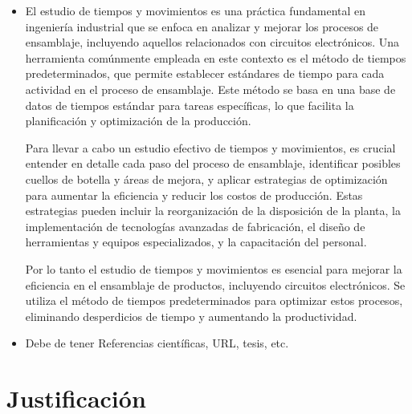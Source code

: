      \begin{itemize}
         \item 
    El estudio de tiempos y movimientos es una práctica fundamental en ingeniería industrial que se enfoca en analizar y mejorar los procesos de ensamblaje, incluyendo aquellos relacionados con circuitos electrónicos. Una herramienta comúnmente empleada en este contexto es el método de tiempos predeterminados, que permite establecer estándares de tiempo para cada actividad en el proceso de ensamblaje. Este método se basa en una base de datos de tiempos estándar para tareas específicas, lo que facilita la planificación y optimización de la producción.
    
    Para llevar a cabo un estudio efectivo de tiempos y movimientos, es crucial entender en detalle cada paso del proceso de ensamblaje, identificar posibles cuellos de botella y áreas de mejora, y aplicar estrategias de optimización para aumentar la eficiencia y reducir los costos de producción. Estas estrategias pueden incluir la reorganización de la disposición de la planta, la implementación de tecnologías avanzadas de fabricación, el diseño de herramientas y equipos especializados, y la capacitación del personal.
    
    Por lo tanto el estudio de tiempos y movimientos es esencial para mejorar la eficiencia en el ensamblaje de productos, incluyendo circuitos electrónicos. Se utiliza el método de tiempos predeterminados para optimizar estos procesos, eliminando desperdicios de tiempo y aumentando la productividad. 
    
    
        \item Debe de tener Referencias científicas, URL, tesis, etc.
        \cite{Niebel}
        
     \end{itemize} 
     
     
         
       
    
    \section{Justificación}
    
